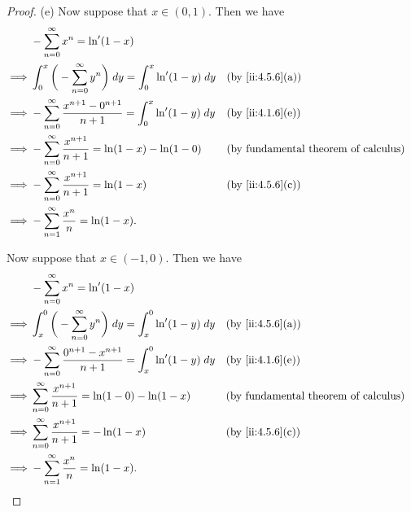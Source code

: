 \begin{proof}{(e)}
  Now suppose that \(x \in (0, 1)\).
  Then we have
  \begin{align*}
             & - \sum_{n = 0}^\infty x^n = \ln'(1 - x)                                                                                                  \\
    \implies & \int_0^x \bigg(- \sum_{n = 0}^\infty y^n\bigg) \; dy = \int_0^x \ln'(1 - y) \; dy       &  & \by{ii:4.5.6}[a]                            \\
    \implies & - \sum_{n = 0}^\infty \dfrac{x^{n + 1} - 0^{n + 1}}{n + 1} = \int_0^x \ln'(1 - y) \; dy &  & \by{ii:4.1.6}[e]                            \\
    \implies & - \sum_{n = 0}^\infty \dfrac{x^{n + 1}}{n + 1} = \ln(1 - x) - \ln(1 - 0)                &  & \text{(by fundamental theorem of calculus)} \\
    \implies & - \sum_{n = 0}^\infty \dfrac{x^{n + 1}}{n + 1} = \ln(1 - x)                             &  & \by{ii:4.5.6}[c]                            \\
    \implies & - \sum_{n = 1}^\infty \dfrac{x^n}{n} = \ln(1 - x).
  \end{align*}

  Now suppose that \(x \in (-1, 0)\).
  Then we have
  \begin{align*}
             & - \sum_{n = 0}^\infty x^n = \ln'(1 - x)                                                                                                  \\
    \implies & \int_x^0 \bigg(- \sum_{n = 0}^\infty y^n\bigg) \; dy = \int_x^0 \ln'(1 - y) \; dy       &  & \by{ii:4.5.6}[a]                            \\
    \implies & - \sum_{n = 0}^\infty \dfrac{0^{n + 1} - x^{n + 1}}{n + 1} = \int_x^0 \ln'(1 - y) \; dy &  & \by{ii:4.1.6}[e]                            \\
    \implies & \sum_{n = 0}^\infty \dfrac{x^{n + 1}}{n + 1} = \ln(1 - 0) - \ln(1 - x)                  &  & \text{(by fundamental theorem of calculus)} \\
    \implies & \sum_{n = 0}^\infty \dfrac{x^{n + 1}}{n + 1} = -\ln(1 - x)                              &  & \by{ii:4.5.6}[c]                            \\
    \implies & - \sum_{n = 1}^\infty \dfrac{x^n}{n} = \ln(1 - x).
  \end{align*}


\end{proof}
